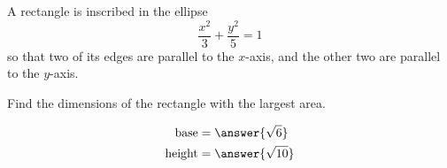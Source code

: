 \documentclass{ximera}
\author{Bart Snapp}
\begin{document}
\begin{exercise}

  A rectangle is inscribed in the ellipse
  \[
 	 \frac{x^2}{3}+\frac{y^2}{5}=1
  \]
  so that two of its edges are parallel to the $x$-axis, and the other two are parallel to the $y$-axis.
  
  Find the dimensions of the rectangle with the largest area.
  \begin{prompt}
  \begin{align*}
  \text{base} &= \answer{\sqrt{6}}\\
  \text{height} &= \answer{\sqrt{10}}
  \end{align*}
  \end{prompt}
\end{exercise}
\end{document}
